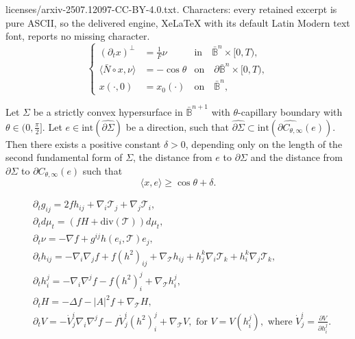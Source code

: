 \documentclass[10pt,a4paper]{amsart}
\begin{document}
licenses/arxiv-2507.12097-CC-BY-4.0.txt. Characters: every retained excerpt is pure ASCII, so the delivered engine, XeLaTeX with its default Latin Modern text font, reports no missing character.
\begin{equation}\label{Inverse-flow}
	\left\{\begin{aligned}
		\left(\partial_t x\right)^{\bot}&=\frac{1}{F}\nu &\text{in}\quad \bar{\mathbb{B}}^n \times[0,T),\\
		\langle\bar{N}\circ x,\nu\rangle&=-\cos\theta  &\text{on}\quad \partial\bar{\mathbb{B}}^n \times[0,T),\\
		x(\cdot,0)&=x_0(\cdot)  &\text{on} \quad \bar{\mathbb{B}}^n,
	\end{aligned}\right.
\end{equation}

\begin{lem}\label{Lem-es-height}
	Let $\Sigma$ be a strictly convex hypersurface in $\bar{\mathbb{B}}^{n+1}$ with $\theta$-capillary boundary with $\theta\in(0,\frac{\pi}{2}]$. Let $e\in\mathrm{int}(\widehat{\partial\Sigma})$ be a direction, such that $\widehat{\partial\Sigma}\subset\mathrm{int}(\widehat{\partial C_{\theta,\infty}}(e))$. Then there exists a positive constant $\delta>0$, depending only on the length of the second fundamental form of $\Sigma$, the distance from $e$ to $\partial\Sigma$ and the distance from $\partial\Sigma$ to $\partial C_{\theta,\infty}(e)$ such that
	\begin{equation}
		\langle x,e\rangle\geq \cos\theta+\delta.
	\end{equation}
\end{lem}

	\begin{align}
		&\partial_t{g_{ij}}=2f h_{ij}+\nabla_i \mathcal{T}_j+\nabla_j \mathcal{T}_i,\label{ev-metric}\\
		&\partial_t d\mu_t=(fH+\mathrm{div}(\mathcal{T}))d\mu_t,\label{ev-area}\\
		&\partial_t\nu=-\nabla f+g^{ij}h(e_i,\mathcal{T})e_j,\label{ev-normal}\\
		&\partial_t h_{ij}=-\nabla_i\nabla_j f+f(h^2)_{ij}+\nabla_\mathcal{T}{h_{ij}}+h_j^k\nabla_i{\mathcal{T}_k}+h_i^k\nabla_j{\mathcal{T}_k},\label{ev-sfn}\\
		&\partial_t h_i^j=-\nabla_i\nabla^j f-f(h^2)_i^j+\nabla_\mathcal{T} h_i^j,\label{ev-Wg}\\
		&\partial_t H=-\Delta f-|A|^2 f+\nabla_\mathcal{T}{H},\label{ev-H}\\
		&\partial_t V=-\dot{V}_j^i\nabla_i\nabla^j f-f \dot{V}_j^i(h^2)_i^j+\nabla_\mathcal{T}{V},\,\,\text{for}\,\, V=V(h_i^j),\,\,\text{where}\,\, \dot{V}_j^i=\frac{\partial V}{\partial h_i^j}. \label{ev-F}
	\end{align}
\end{document}
